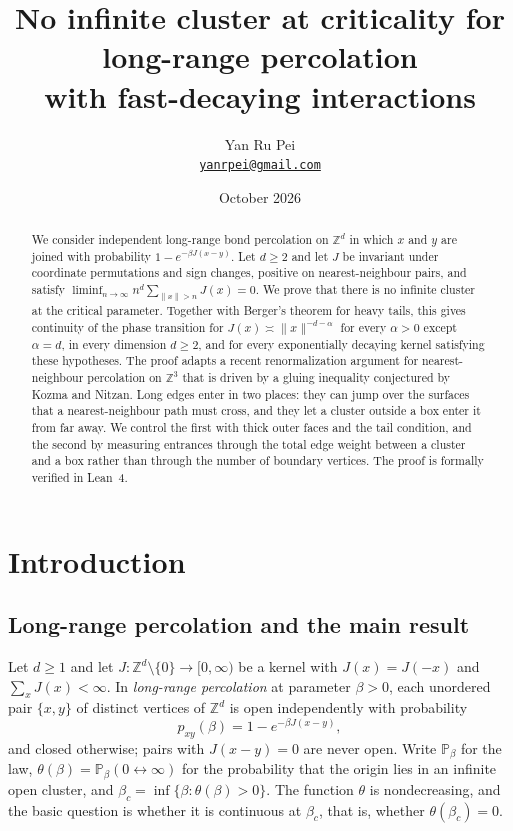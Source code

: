 \documentclass[11pt]{article}
\title{No infinite cluster at criticality for long-range percolation\\ with fast-decaying interactions}
\author{Yan Ru Pei\\[0.3em]\small\href{mailto:yanrpei@gmail.com}{\texttt{yanrpei@gmail.com}}}
\date{October 2026}
\theoremstyle{definition}
\theoremstyle{remark}
\numberwithin{equation}{section}
\newcommand{\Z}{\mathbb Z}
\newcommand{\Pp}{\mathbb P}
\newcommand{\1}{\mathbf 1}
\newcommand{\lr}{\leftrightarrow}
\begin{document}
\maketitle

\begin{abstract}
We consider independent long-range bond percolation on $\mathbb{Z}^d$ in which $x$ and $y$ are
joined with probability $1-e^{-\beta J(x-y)}$. Let $d\ge2$ and let $J$ be invariant under coordinate
permutations and sign changes, positive on nearest-neighbour pairs, and satisfy
$\liminf_{n\to\infty} n^d\sum_{\|x\|>n}J(x)=0$. We prove that there is no infinite cluster at the
critical parameter. Together with Berger's theorem for heavy tails, this gives continuity of the
phase transition for $J(x)\asymp\|x\|^{-d-\alpha}$ for every $\alpha>0$ except $\alpha=d$, in every
dimension $d\ge2$, and for every exponentially decaying kernel satisfying these hypotheses.
The proof adapts a recent renormalization argument for nearest-neighbour percolation on
$\mathbb{Z}^3$ that is driven by a gluing inequality conjectured by Kozma and Nitzan. Long edges enter in two
places: they can jump over the surfaces that a nearest-neighbour path must cross, and they let a
cluster outside a box enter it from far away. We control the first with thick outer faces and the
tail condition, and the second by measuring entrances through the total edge weight between a
cluster and a box rather than through the number of boundary vertices. The proof is formally
verified in Lean~4.
\end{abstract}

\section{Introduction}\label{sec:intro}

\subsection{Long-range percolation and the main result}

Let $d\ge1$ and let $J:\Z^d\setminus\{0\}\to[0,\infty)$ be a kernel with $J(x)=J(-x)$ and
$\sum_xJ(x)<\infty$. In
\emph{long-range percolation} at parameter $\beta>0$, each unordered pair $\{x,y\}$ of distinct
vertices of $\Z^d$ is open independently with probability
\[
p_{xy}(\beta)=1-e^{-\beta J(x-y)},
\]
and closed otherwise; pairs with $J(x-y)=0$ are never open. Write $\Pp_\beta$ for the law,
$\theta(\beta)=\Pp_\beta(0\lr\infty)$ for the probability that the origin lies in an infinite open
cluster, and $\beta_c=\inf\{\beta:\theta(\beta)>0\}$. The function $\theta$ is nondecreasing, and
the basic question is whether it is continuous at $\beta_c$, that is, whether $\theta(\beta_c)=0$.
\end{document}
